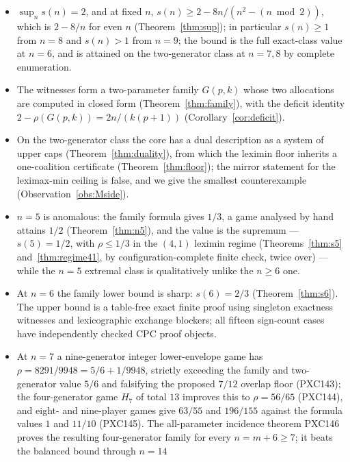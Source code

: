 \documentclass[11pt]{article}
\begin{document}
\begin{itemize}[nosep]
\item $\sup_n s(n)=2$, and at fixed $n$, $s(n)\ge 2-8n/(n^2-(n\bmod2))$,
      which is $2-8/n$ for even $n$ (Theorem~\ref{thm:sup}); in particular
      $s(n)\ge1$ from $n=8$ and $s(n)>1$ from $n=9$; the bound is the full
      exact-class value at $n=6$, and is attained on the two-generator class
      at $n=7,8$ by complete enumeration.
\item The witnesses form a two-parameter family $G(p,k)$ whose two
      allocations are computed in closed form (Theorem~\ref{thm:family}),
      with the deficit identity $2-\rho(G(p,k))=2n/(k(p+1))$
      (Corollary~\ref{cor:deficit}).
\item On the two-generator class the core has a dual description as a system
      of upper caps (Theorem~\ref{thm:duality}), from which the leximin floor
      inherits a one-coalition certificate (Theorem~\ref{thm:floor}); the
      mirror statement for the leximax-min ceiling is false, and we give the
      smallest counterexample (Observation~\ref{obs:Mside}).
\item $n=5$ is anomalous: the family formula gives $1/3$, a game analysed
      by hand attains $1/2$ (Theorem~\ref{thm:n5}), and the value is the
      supremum --- $s(5)=1/2$, with $\rho\le1/3$ in the $(4,1)$ leximin
      regime (Theorems~\ref{thm:s5} and~\ref{thm:regime41}, by
      configuration-complete finite check, twice over) --- while the $n=5$
      extremal class is qualitatively unlike the $n\ge6$ one.
\item At $n=6$ the family lower bound is sharp: $s(6)=2/3$
      (Theorem~\ref{thm:s6}).  The upper bound is a table-free exact finite
      proof using singleton exactness witnesses and lexicographic exchange
      blockers; all fifteen sign-count cases have independently checked CPC
      proof objects.
\item At $n=7$ a nine-generator integer lower-envelope game has
      \(\rho=8291/9948=5/6+1/9948\), strictly exceeding the family and
      two-generator value \(5/6\) and falsifying the proposed \(7/12\)
      overlap floor (PXC143); the four-generator game \(H_7\) of total
      \(13\) improves this to \(\rho=56/65\) (PXC144), and eight- and
      nine-player games give \(63/55\) and \(196/155\) against the
      formula values \(1\) and \(11/10\) (PXC145).  The all-parameter
      incidence theorem PXC146 proves the resulting four-generator family
      for every \(n=m+6\ge7\); it beats the balanced bound through \(n=14\)

\end{itemize}
\end{document}
